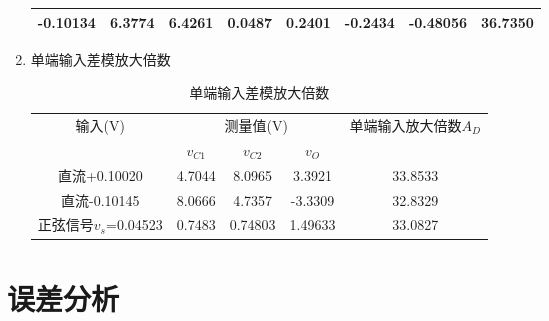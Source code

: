 \documentclass[a4paper]{article}
\begin{document}
\begin{enumerate}
\begin{table}[!h]
\begin{tabular}{|c|c|c|c|c|c|c|c|}
-0.10134               & 6.3774   & 6.4261   & 0.0487  & 0.2401   & -0.2434  & -0.48056 & 36.7350 \\ \hline
\end{tabular}
\end{table}
\item 单端输入差模放大倍数\\
\begin{table}[!h]
\centering
\caption{单端输入差模放大倍数}
\label{AD1table}
\begin{tabular}{|c|c|c|c|c|}
\hline
\multirow{2}{*}{输入(V)} & \multicolumn{3}{c|}{测量值(V)}   & \multirow{2}{*}{单端输入放大倍数$A_D$} \\ \cline{2-4}
                       & $v_{C1}$ & $v_{C2}$ & $v_{O}$ &                                \\ \hline
直流+0.10020             & 4.7044   & 8.0965   & 3.3921  & 33.8533                        \\ \hline
直流-0.10145               & 8.0666   & 4.7357   & -3.3309 & 32.8329                        \\ \hline
正弦信号$v_{s}$=0.04523    & 0.7483   & 0.74803  & 1.49633 & 33.0827                        \\ \hline
\end{tabular}
\end{table}
\end{enumerate}

\section{误差分析}
\iffalse
\begin{enumerate}
\item 调整静态\\
实验要求调整静态工作点时使电路完全对称，实际上，即使在某一时刻将$V_{C1}$和$V_{C2}$调至相等，由于仪器的不稳定性，静态工作点也会渐渐发生偏移。在后续实验时，很可能已经偏离静态工作点相当程度，因此产生影响。
\item 电源\\
实验要求电源为恒流源，实际使用的是恒压源，随着电路使用时间的增长，一些元器件(如电阻)因为发热而该改变阻值从而影响电路电流的稳定性，造成影响。
\item 零点漂移$^{\cite{jiaocai}}$\\
零点漂移指当放大电路的输入端短路时，输出端还有缓慢变化的电压产生的现象。这种现象的主要原因是温度引起的半导体元件参数变化。尽管差动放大器可以抑制零点漂移，但是若电路不完全对称，则还可能会有零点漂移的现象。
\end{enumerate}
\fi
\end{document}
